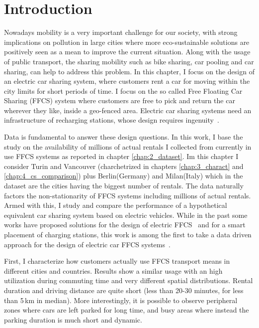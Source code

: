 \section{Introduction}
\label{sec:6_1_intro}

Nowadays mobility is a very important challenge for our society, with strong implications on pollution in large cities where more eco-sustainable solutions are positively seen as a mean to improve the current situation.
Along with the usage of public transport, the sharing mobility such as bike sharing, car pooling and car sharing, can help to address this problem. In this chapter,  I focus on the design of an electric car sharing system, where customers rent a car for moving within the city limits for short periods of time. I focus on the so called Free Floating Car Sharing (FFCS) system where customers are free to pick and return the car wherever they like, inside a geo-fenced area.
Electric car sharing systems need an infrastructure of recharging stations, whose design requires ingenuity~\cite{PlacementAndPowergrid,placementAustin,mipCSPpechino}. 


Data is fundamental to answer these design questions. In this work, I base the study on the availability of millions of actual rentals I collected from currently in use FFCS systems as reported in chapter \ref{chap:2_dataset}. Im this chapter I consider Turin and Vancouver (charchetrized in chapters \ref{chap:3_charact} and \ref{chap:4_cs_comparison}) plus Berlin(Germany) and Milan(Italy) which in the dataset are the cities having the biggest number of rentals.
The data naturally factors the non-stationarity of FFCS systems including millions of actual rentals. Armed with this, I study and compare the performance of a hypothetical equivalent car sharing system based on electric vehicles.  While in the past some works have proposed solutions for the design of electric FFCS~\cite{FM15,WB15} and for a smart placement of charging stations, this work is among the first to take a data driven approach for the design of electric car FFCS systems~\cite{ChargingStationForVehicularNetworks,mipCSPpechino,PlacementAndPowergrid,placementAustin}.

First, I characterize how customers actually use FFCS transport means in different cities and countries. Results show a similar usage with an high utilization during commuting time and very different spatial distributions. Rental duration and driving distance are quite short (less than 20-30 minutes, for less than 5\,km in median). More interestingly, it is possible to observe peripheral zones where cars are left parked for long time, and busy areas where instead the parking duration is much short and dynamic.

